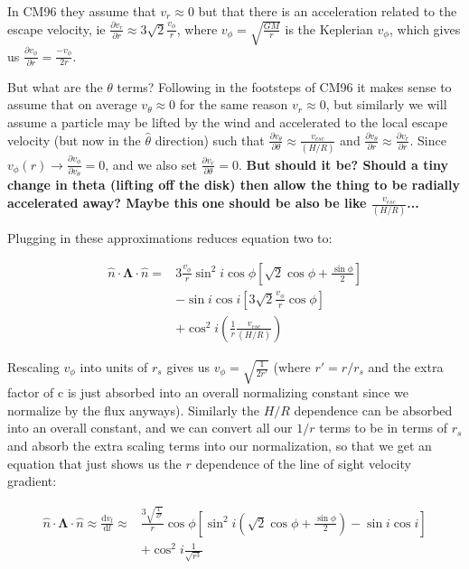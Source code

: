 \documentclass{article}
\begin{document}
In CM96 they assume that $v_r \approx 0$ but that there is an acceleration related to the escape velocity, ie $\frac{\partial v_r}{\partial r} \approx 3\sqrt{2}\frac{v_\phi}{r}$, where $v_\phi = \sqrt{\frac{GM}{r}}$ is the Keplerian $v_\phi$, which gives us $\frac{\partial v_\phi}{\partial r} =  \frac{-v_\phi}{2r}$.

But what are the $\theta$ terms? Following in the footsteps of CM96 it makes sense to assume that on average $v_\theta \approx 0$ for the same reason $v_r \approx 0$, but similarly we will assume a particle may be lifted by the wind and accelerated to the local escape velocity (but now in the $\hat{\theta}$ direction) such that $\frac{\partial v_\theta}{\partial \theta} \approx \frac{v_{esc}}{\left(H/R\right)}$ and $\frac{\partial v_\theta}{\partial r} \approx \frac{\partial v_r}{\partial r}$. Since $v_\phi(r) \rightarrow \frac{\partial v_\phi}{\partial v_\theta} = 0$, and we also set $\frac{\partial v_r}{\partial \theta} = 0$. \textbf{But should it be? Should a tiny change in theta (lifting off the disk) then allow the thing to be radially accelerated away? Maybe this one should be also be like $\frac{v_{esc}}{(H/R)}$...}

Plugging in these approximations reduces equation two to:

\begin{equation} \label{eq3}
\begin{split}
\hat{n}\cdot\boldsymbol{\Lambda}\cdot\hat{n} = & 3\frac{v_\phi}{r} \sin^2i\cos\phi\left[\sqrt{2}\cos\phi + \frac{\sin\phi}{2}\right]\\
& -\sin i \cos i \left[3\sqrt{2}\frac{v_\phi}{r}\cos\phi\right] \\
& +\cos^2i\left(\frac{1}{r}\frac{v_{esc}}{(H/R)}\right)
\end{split}
\end{equation}

Rescaling $v_\phi$ into units of $r_s$ gives us $v_\phi = \sqrt{\frac{1}{2r'}}$ (where $r' = r/r_s$ and the extra factor of c is just absorbed into an overall normalizing constant since we normalize by the flux anyways). Similarly the $H/R$ dependence can be absorbed into an overall constant, and we can convert all our $1/r$ terms to be in terms of $r_s$ and absorb the extra scaling terms into our normalization, so that we get an equation that just shows us the $r$ dependence of the line of sight velocity gradient:

\begin{equation} \label{eq4}
\begin{split}
\hat{n}\cdot\boldsymbol{\Lambda}\cdot\hat{n} \approx \frac{\mathrm{d}v_l}{\mathrm{d}l} \approx & \frac{3\sqrt{\frac{1}{2r}}}{r}\cos\phi\left[\sin^2i\left(\sqrt{2}\cos\phi + \frac{\sin\phi}{2}\right)-\sin i \cos i\right]\\
& + \cos^2i\frac{1}{\sqrt{r^3}}
\end{split}
\end{equation}
\end{document}
